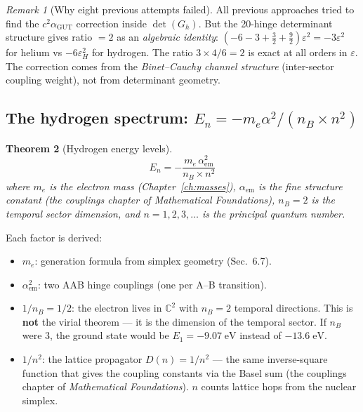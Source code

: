 \documentclass[12pt]{article}
\newtheorem{theorem}{Theorem}[section]
\theoremstyle{remark}
\newtheorem{remark}[theorem]{Remark}
\theoremstyle{definition}
\newcommand{\CC}{\mathbb{C}}
\begin{document}
\begin{remark}[Why eight previous attempts failed]
All previous approaches tried to find the $c^2\alpha_\text{GUT}$ correction inside $\det(G_h)$.  But the 20-hinge determinant structure gives ratio $= 2$ as an \emph{algebraic identity}: $(-6 - 3 + \tfrac{3}{2} + \tfrac{9}{2})\varepsilon^2 = -3\varepsilon^2$ for helium vs $-6\varepsilon_H^2$ for hydrogen.  The ratio $3 \times 4 / 6 = 2$ is exact at all orders in $\varepsilon$.  The correction comes from the \emph{Binet--Cauchy channel structure} (inter-sector coupling weight), not from determinant geometry.
\end{remark}

\subsection{The hydrogen spectrum: $E_n = -m_e\alpha^2/(n_B \times n^2)$}

\begin{theorem}[Hydrogen energy levels]
\begin{equation}
\boxed{E_n = -\frac{m_e\,\alpha_\text{em}^2}{n_B \times n^2}}
\end{equation}
where $m_e$ is the electron mass (Chapter~\ref{ch:masses}), $\alpha_\text{em}$ is the fine structure constant (the couplings chapter of \textit{Mathematical Foundations}), $n_B = 2$ is the temporal sector dimension, and $n = 1, 2, 3, \ldots$ is the principal quantum number.
\end{theorem}

Each factor is derived:
\begin{itemize}
\item $m_e$: generation formula from simplex geometry (Sec.~6.7).
\item $\alpha_\text{em}^2$: two AAB hinge couplings (one per A--B transition).
\item $1/n_B = 1/2$: the electron lives in $\CC^2$ with $n_B = 2$ temporal directions. This is \textbf{not} the virial theorem --- it is the dimension of the temporal sector. If $n_B$ were 3, the ground state would be $E_1 = -9.07\;\text{eV}$ instead of $-13.6\;\text{eV}$.
\item $1/n^2$: the lattice propagator $D(n) = 1/n^2$ --- the same inverse-square function that gives the coupling constants via the Basel sum (the couplings chapter of \textit{Mathematical Foundations}). $n$ counts lattice hops from the nuclear simplex.
\end{itemize}
\end{document}
